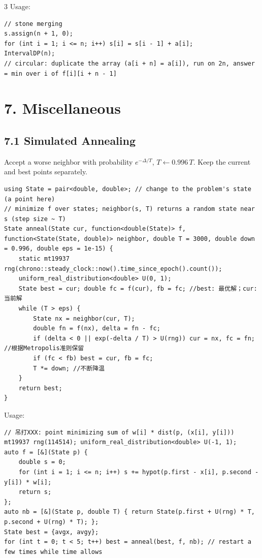 \documentclass[8pt]{extarticle}
\begin{document}
\begin{multicols*}{3}
Usage:

\begin{lstlisting}
// stone merging
s.assign(n + 1, 0);
for (int i = 1; i <= n; i++) s[i] = s[i - 1] + a[i];
IntervalDP(n);
// circular: duplicate the array (a[i + n] = a[i]), run on 2n, answer = min over i of f[i][i + n - 1]
\end{lstlisting}

\section*{7. Miscellaneous}

\subsection*{7.1 Simulated Annealing}

Accept a worse neighbor with probability $e^{-\Delta / T}$, $T \leftarrow 0.996\,T$. Keep the current and best points separately.

\begin{lstlisting}
using State = pair<double, double>; // change to the problem's state (a point here)
// minimize f over states; neighbor(s, T) returns a random state near s (step size ~ T)
State anneal(State cur, function<double(State)> f, function<State(State, double)> neighbor, double T = 3000, double down = 0.996, double eps = 1e-15) {
    static mt19937 rng(chrono::steady_clock::now().time_since_epoch().count());
    uniform_real_distribution<double> U(0, 1);
    State best = cur; double fc = f(cur), fb = fc; //best: 最优解；cur: 当前解
    while (T > eps) {
        State nx = neighbor(cur, T);
        double fn = f(nx), delta = fn - fc;
        if (delta < 0 || exp(-delta / T) > U(rng)) cur = nx, fc = fn; //根据Metropolis准则保留
        if (fc < fb) best = cur, fb = fc;
        T *= down; //不断降温
    }
    return best;
}
\end{lstlisting}

Usage:

\begin{lstlisting}
// 吊打XXX: point minimizing sum of w[i] * dist(p, (x[i], y[i]))
mt19937 rng(114514); uniform_real_distribution<double> U(-1, 1);
auto f = [&](State p) {
    double s = 0;
    for (int i = 1; i <= n; i++) s += hypot(p.first - x[i], p.second - y[i]) * w[i];
    return s;
};
auto nb = [&](State p, double T) { return State(p.first + U(rng) * T, p.second + U(rng) * T); };
State best = {avgx, avgy};
for (int t = 0; t < 5; t++) best = anneal(best, f, nb); // restart a few times while time allows
\end{lstlisting}


\end{multicols*}
\end{document}
